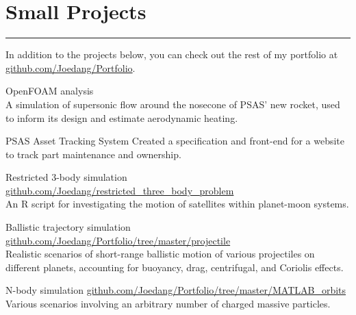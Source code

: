 \section{Small Projects}
\noindent\rule{\textwidth}{\hlinewidth}
In addition to the projects below, you can check out the rest of my portfolio at \url{github.com/Joedang/Portfolio}.
	\begin{innerlist}
	\item OpenFOAM analysis\\
	A simulation of supersonic flow around the nosecone of PSAS' new rocket, used to inform its design and estimate aerodynamic heating.
	\item PSAS Asset Tracking System
	Created a specification and front-end for a website to track part maintenance and ownership.
	\item Restricted 3-body simulation \hfill\url{github.com/Joedang/restricted\_three\_body\_problem}\\
	An R script for investigating the motion of satellites within planet-moon systems. 
	\item Ballistic trajectory simulation \hfill\url{github.com/Joedang/Portfolio/tree/master/projectile}\\
	Realistic scenarios of short-range ballistic motion of various projectiles on different planets, accounting for buoyancy, drag, centrifugal, and Coriolis effects.
	\item N-body simulation \hfill\url{github.com/Joedang/Portfolio/tree/master/MATLAB\_orbits}\\
	Various scenarios involving an arbitrary number of charged massive particles.
	\end{innerlist}
\vfill
